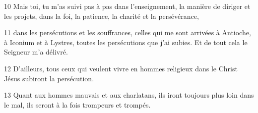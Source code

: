 
10 Mais toi, tu m’as suivi pas à pas dans l’enseignement, la manière de diriger et les projets, dans la foi, la patience, la charité et la persévérance,

11 dans les persécutions et les souffrances, celles qui me sont arrivées à Antioche, à Iconium et à Lystres, toutes les persécutions que j’ai subies. Et de tout cela le Seigneur m’a délivré.

12 D’ailleurs, tous ceux qui veulent vivre en hommes religieux dans le Christ Jésus subiront la persécution.

13 Quant aux hommes mauvais et aux charlatans, ils iront toujours plus loin dans le mal, ils seront à la fois trompeurs et trompés.